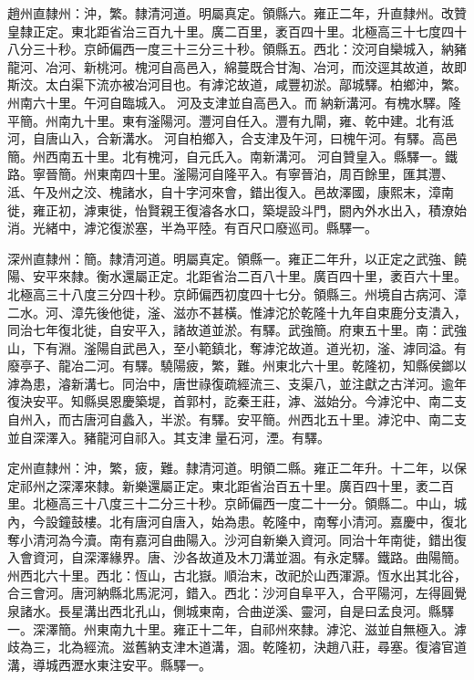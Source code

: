 \begin{pinyinscope}
趙州直隸州：沖，繁。隸清河道。明屬真定。領縣六。雍正二年，升直隸州。改贊皇隸正定。東北距省治三百九十里。廣二百里，袤百四十里。北極高三十七度四十八分三十秒。京師偏西一度三十三分三十秒。領縣五。西北：洨河自欒城入，納豬龍河、冶河、新桃河。槐河自高邑入，綿蔓既合甘淘、冶河，而洨逕其故道，故即斯洨。太白渠下流亦被冶河目也。有滹沱故道，咸豐初淤。鄗城驛。柏鄉沖，繁。州南六十里。午河自臨城入。河及支津並自高邑入。而納新溝河。有槐水驛。隆平簡。州南九十里。東有滏陽河。灃河自任入。灃有九閘，雍、乾中建。北有泜河，自唐山入，合新溝水。河自柏鄉入，合支津及午河，曰槐午河。有驛。高邑簡。州西南五十里。北有槐河，自元氏入。南新溝河。河自贊皇入。縣驛一。鐵路。寧晉簡。州東南四十里。滏陽河自隆平入。有寧晉泊，周百餘里，匯其灃、泜、午及州之洨、槐諸水，自十字河來會，錯出復入。邑故澤國，康熙末，漳南徙，雍正初，滹東徙，怡賢親王復濬各水口，築堤設斗門，閼內外水出入，積潦始消。光緒中，滹沱復淤塞，半為平陸。有百尺口廢巡司。縣驛一。

深州直隸州：簡。隸清河道。明屬真定。領縣一。雍正二年升，以正定之武強、饒陽、安平來隸。衡水還屬正定。北距省治二百八十里。廣百四十里，袤百六十里。北極高三十八度三分四十秒。京師偏西初度四十七分。領縣三。州境自古病河、漳二水。河、漳先後他徙，滏、滋亦不甚橫。惟滹沱於乾隆十九年自束鹿分支潰入，同治七年復北徙，自安平入，諸故道並淤。有驛。武強簡。府東五十里。南：武強山，下有淵。滏陽自武邑入，至小範鎮北，奪滹沱故道。道光初，滏、滹同溢。有廢亭子、龍冶二河。有驛。驍陽疲，繁，難。州東北六十里。乾隆初，知縣侯鎯以滹為患，濬新溝七。同治中，唐世祿復疏經流三、支渠八，並注獻之古洋河。逾年復決安平。知縣吳恩慶築堤，首郭村，訖秦王莊，滹、滋始分。今滹沱中、南二支自州入，而古唐河自蠡入，半淤。有驛。安平簡。州西北五十里。滹沱中、南二支並自深澤入。豬龍河自祁入。其支津量石河，湮。有驛。

定州直隸州：沖，繁，疲，難。隸清河道。明領二縣。雍正二年升。十二年，以保定祁州之深澤來隸。新樂還屬正定。東北距省治百五十里。廣百四十里，袤二百里。北極高三十八度三十二分三十秒。京師偏西一度二十一分。領縣二。中山，城內，今設鐘鼓樓。北有唐河自唐入，始為患。乾隆中，南奪小清河。嘉慶中，復北奪小清河為今瀆。南有嘉河自曲陽入。沙河自新樂入資河。同治十年南徙，錯出復入會資河，自深澤緣界。唐、沙各故道及木刀溝並涸。有永定驛。鐵路。曲陽簡。州西北六十里。西北：恆山，古北嶽。順治末，改祀於山西渾源。恆水出其北谷，合三會河。唐河納縣北馬泥河，錯入。西北：沙河自阜平入，合平陽河，左得圓覺泉諸水。長星溝出西北孔山，側城東南，合曲逆溪、靈河，自是曰孟良河。縣驛一。深澤簡。州東南九十里。雍正十二年，自祁州來隸。滹沱、滋並自無極入。滹歧為三，北為經流。滋舊納支津木道溝，涸。乾隆初，決趙八莊，尋塞。復濬官道溝，導城西瀝水東注安平。縣驛一。


\end{pinyinscope}